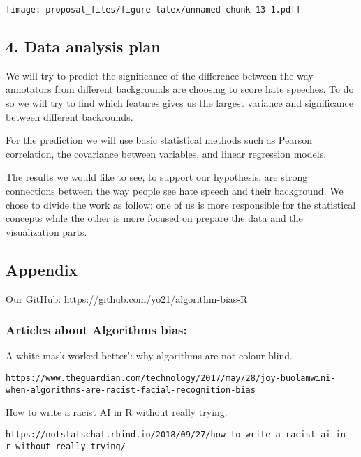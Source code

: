 \documentclass[
]{article}
\begin{document}
\texttt{[image: proposal\_files/figure-latex/unnamed-chunk-13-1.pdf]}

\hypertarget{data-analysis-plan}{%
\subsection{4. Data analysis plan}\label{data-analysis-plan}}

We will try to predict the significance of the difference between the
way annotators from different backgrounds are choosing to score hate
speeches. To do so we will try to find which features gives us the
largest variance and significance between different backrounds.

For the prediction we will use basic statistical methods such as Pearson
correlation, the covariance between variables, and linear regression
models.

The results we would like to see, to support our hypothesis, are strong
connections between the way people see hate speech and their background.
We chose to divide the work as follow: one of us is more responsible for
the statistical concepts while the other is more focused on prepare the
data and the visualization parts.

\hypertarget{appendix}{%
\subsection{Appendix}\label{appendix}}

Our GitHub: \url{https://github.com/yo21/algorithm-bias-R}

\hypertarget{articles-about-algorithms-bias}{%
\subsubsection{Articles about Algorithms
bias:}\label{articles-about-algorithms-bias}}

A white mask worked better': why algorithms are not colour blind.

\begin{verbatim}
https://www.theguardian.com/technology/2017/may/28/joy-buolamwini-when-algorithms-are-racist-facial-recognition-bias
\end{verbatim}

How to write a racist AI in R without really trying.

\begin{verbatim}
https://notstatschat.rbind.io/2018/09/27/how-to-write-a-racist-ai-in-r-without-really-trying/
\end{verbatim}
\end{document}
